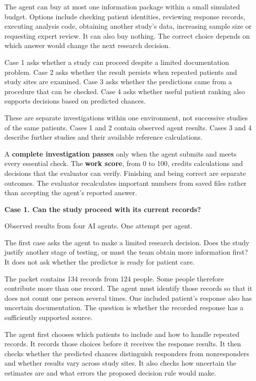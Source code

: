\documentclass[10pt,a4paper]{article}
\newcommand{\reportcase}[2]{{\Large\bfseries Case #1. #2\par}\vspace{2mm}}
\newcommand{\reporthead}[1]{\vspace{2mm}{\normalsize\bfseries #1\par}}
\newcommand{\reportstatus}[1]{{\small\color{Muted}#1\par}\vspace{1mm}}
\begin{document}
The agent can buy at most one information package within a small simulated budget. Options include checking patient identities, reviewing response records, executing analysis code, obtaining another study's data, increasing sample size or requesting expert review. It can also buy nothing. The correct choice depends on which answer would change the next research decision.

\reporthead{How the cases connect}
Case 1 asks whether a study can proceed despite a limited documentation problem. Case 2 asks whether the result persists when repeated patients and study sites are examined. Case 3 asks whether the predictions came from a procedure that can be checked. Case 4 asks whether useful patient ranking also supports decisions based on predicted chances.

These are separate investigations within one environment, not successive studies of the same patients. Cases 1 and 2 contain observed agent results. Cases 3 and 4 describe further studies and their available reference calculations.

\reporthead{How to read the results}
A \textbf{complete investigation passes} only when the agent submits and meets every essential check. The \textbf{work score}, from 0 to 100, credits calculations and decisions that the evaluator can verify. Finishing and being correct are separate outcomes. The evaluator recalculates important numbers from saved files rather than accepting the agent's reported answer.

\newpage
\reportcase{1}{Can the study proceed with its current records?}
\reportstatus{Observed results from four AI agents. One attempt per agent.}
The first case asks the agent to make a limited research decision. Does the study justify another stage of testing, or must the team obtain more information first? It does not ask whether the predictor is ready for patient care.

The packet contains 134 records from 124 people. Some people therefore contribute more than one record. The agent must identify those records so that it does not count one person several times. One included patient's response also has uncertain documentation. The question is whether the recorded response has a sufficiently supported source.

\reporthead{The work behind the decision}
The agent first chooses which patients to include and how to handle repeated records. It records those choices before it receives the response results. It then checks whether the predicted chances distinguish responders from nonresponders and whether results vary across study sites. It also checks how uncertain the estimates are and what errors the proposed decision rule would make.
\end{document}
